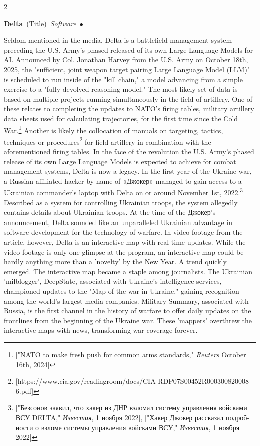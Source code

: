 \documentclass[10pt,a4paper,twoside]{article} %
\newcommand{\entry}[4]{\markboth{#1}{#1}\textbf{#1}\ {(#2)}\ \textit{#3}\ $\bullet$\ {#4}}  %
\begin{document}
\begin{multicols}{2}
\entry{Delta} {Title} {Software} {Seldom mentioned in the media, Delta is a battlefield management system preceding the U.S. Army's phased released of its own Large Language Models for AI. Announced by Col. Jonathan Harvey from the U.S. Army on October 18th, 2025, the "sufficient, joint weapon target pairing Large Language Model (LLM)" is scheduled to run inside of the "kill chain," a model advancing from a simple exercise to a "fully devolved reasoning model." The most likely set of data is based on multiple projects running simultaneously in the field of artillery. One of these relates to completing the updates to NATO's firing tables, military artillery data sheets used for calculating trajectories, for the first time since the Cold War.\footnote{["NATO to make fresh push for common arms standards," \emph{Reuters} October 16th, 2024]} Another is likely the collocation of manuals on targeting, tactics, techniques or procedures\footnote{[https://www.cia.gov/readingroom/docs/CIA-RDP07S00452R000300820008-6.pdf]} for field artillery in combination with the aforementioned firing tables. In the face of the revolution the U.S. Army's phased release of its own Large Language Models is expected to achieve for combat management systems, Delta is now a legacy. 
\newline \indent In the first year of the Ukraine war, a Russian affiliated hacker by name of \textrussian{«Джокер»} managed to gain access to a Ukrainian commander's laptop with Delta on or around November 1st, 2022.\footnote{["\textrussian{Безсонов заявил, что хакер из ДНР взломал систему управления войсками ВСУ DELTA},"  \textukrainian{\emph{Известия}}, 1 \textrussian{ноября} 2022], ["\textrussian{Хакер Джокер рассказал подробности о взломе системы управления войсками ВСУ},"  \textukrainian{\emph{Известия}}, 1 \textrussian{ноября} 2022] } Described as a system for controlling Ukrainian troops, the system allegedly contains details about Ukrainian troops. At the time of the \textrussian{Джокер}'s announcement, Delta sounded like an unparalleled Ukrainian advantage in software development for the technology of warfare. In video footage from the article, however, Delta is an interactive map with real time updates. While the video footage is only one glimpse at the program, an interactive map could be hardly anything more than a 'novelty' by the New Year. A trend quickly emerged. The interactive map became a staple among journalists. The Ukrainian 'milblogger', DeepState, associated with Ukraine's intelligence services, championed updates to the "Map of the war in Ukraine," gaining recognition among the world's largest media companies. Military Summary, associated with Russia, is the first channel in the history of warfare to offer daily updates on the frontlines from the beginning of the Ukraine war. These 'mappers' overthrew the interactive maps with news, transforming war coverage forever. 

}
\end{multicols}
\end{document}
